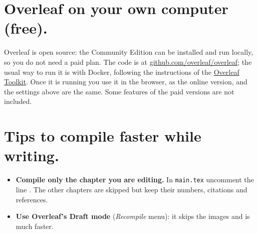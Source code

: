 \section{Overleaf on your own computer (free).}
Overleaf is open source: the Community Edition can be installed and run locally, so you do not need a paid plan. The code is at \href{https://github.com/overleaf/overleaf}{github.com/overleaf/overleaf}; the usual way to run it is with Docker, following the instructions of the \href{https://github.com/overleaf/toolkit}{Overleaf Toolkit}. Once it is running you use it in the browser, as the online version, and the settings above are the same. Some features of the paid versions are not included.


\section{Tips to compile faster while writing.}
\begin{itemize}
  \item \textbf{Compile only the chapter you are editing.} In \texttt{main.tex} uncomment the line \verb||. The other chapters are skipped but keep their numbers, citations and references.
  \item \textbf{Use Overleaf's Draft mode} (\emph{Recompile} menu): it skips the images and is much faster.
\end{itemize}